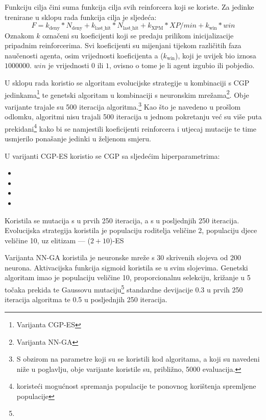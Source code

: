 \documentclass[times, utf8, zavrsni, numeric]{fer}
\begin{document}
Funkciju cilja čini suma funkcija cilja svih reinforcera koji se koriste. Za
jedinke trenirane u sklopu rada funkcija cilja je sljedeća:
\[ F = k_\mathrm{deny} * N_\mathrm{deny} + k_\mathrm{last\_hit} *
N_\mathrm{last\_hit} + k_\mathrm{XPM} * XP/min + k_\mathrm{win} * win \] Oznakom
$k$ označeni su koeficijenti koji se predaju prilikom inicijalizacije pripadnim
reinforcerima. Svi koeficijenti su mijenjani tijekom različitih faza naučenosti
agenta, osim vrijednosti koeficijenta a
($k_\mathrm{win}$), koji je uvijek bio iznosa $1000000$. $win$ je vrijednosti
$0$ ili $1$, ovisno o tome je li agent izgubio ili pobjedio.

U sklopu rada koristio se algoritam evolucijske strategije u kombinaciji s CGP
jedinkama\footnote{Varijanta CGP-ES} te genetski algoritam u kombinaciji s
neuronskim mrežama\footnote{Varijanta NN-GA}. Obje varijante trajale su 500
iteracija algoritma.\footnote{S obzirom na parametre koji su se koristili kod
algoritama, a koji su navedeni niže u poglavlju, obje varijante koristile su,
približno, 5000 evaluacija.} Kao što je navedeno u prošlom odlomku, algoritmi
nisu trajali 500 iteracija u jednom pokretanju već su više puta
prekidani\footnote{koristeći mogućnost spremanja populacije te ponovnog
korištenja spremljene populacije} kako bi se namjestili koeficijenti reinforcera
i utjecaj mutacije te time usmjerilo ponašanje jedinki u željenom smjeru.

U varijanti CGP-ES koristio se CGP sa sljedećim hiperparametrima:
\begin{itemize}
    \item {}
    \item {}
    \item {}
    \item {}
\end{itemize}
Koristila se mutacija  s  u prvih 250
iteracija, a s  u posljednjih 250 iteracija. Evolucijska strategija
koristila je populaciju roditelja veličine 2, populaciju djece veličine 10, uz
elitizam --- ($2 + 10$)-ES\

Varijanta NN-GA koristila je neuronske mreže s 30 skrivenih slojeva od 200
neurona. Aktivacijska funkcija sigmoid koristila se u svim slojevima. Genetski
algoritam imao je populaciju veličine 10, proporcionalnu selekciju, križanje u 5
točaka prekida te Gaussovu mutaciju\footnote{}
standardne devijacije 0.3 u prvih 250 iteracija algoritma te 0.5 u posljednjih
250 iteracija.
\end{document}
